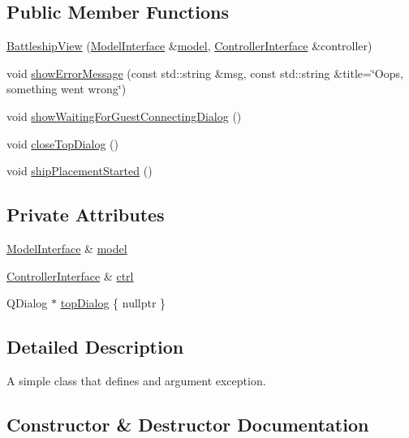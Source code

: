 \subsection*{Public Member Functions}
\begin{DoxyCompactItemize}
\item 
\hyperlink{classGUI_1_1BattleshipView_ac9fd11bfc017f0fe052608d297a5d457}{Battleship\+View} (\hyperlink{classModelInterface}{Model\+Interface} \&\hyperlink{classGUI_1_1BattleshipView_a9253735219a238f80643188b190e90ce}{model}, \hyperlink{classControllerInterface}{Controller\+Interface} \&controller)
\item 
void \hyperlink{classGUI_1_1BattleshipView_af7b5e55bee9a37cc4f9a861af40c120b}{show\+Error\+Message} (const std\+::string \&msg, const std\+::string \&title=\char`\"{}Oops, something went wrong\char`\"{})
\item 
void \hyperlink{classGUI_1_1BattleshipView_a511f6d90d37e864a1879eb6f5bd6f9cb}{show\+Waiting\+For\+Guest\+Connecting\+Dialog} ()
\item 
void \hyperlink{classGUI_1_1BattleshipView_aec4e5a4c453a3913c0a25435cfc92dd6}{close\+Top\+Dialog} ()
\item 
void \hyperlink{classGUI_1_1BattleshipView_a471a07ce060e70b1cfa03ce3674fba80}{ship\+Placement\+Started} ()
\end{DoxyCompactItemize}
\subsection*{Private Attributes}
\begin{DoxyCompactItemize}
\item 
\hyperlink{classModelInterface}{Model\+Interface} \& \hyperlink{classGUI_1_1BattleshipView_a9253735219a238f80643188b190e90ce}{model}
\item 
\hyperlink{classControllerInterface}{Controller\+Interface} \& \hyperlink{classGUI_1_1BattleshipView_a15e61471831211a4301410bdd802a4a4}{ctrl}
\item 
Q\+Dialog $\ast$ \hyperlink{classGUI_1_1BattleshipView_a08be9ec085bb0c3f19f8efe83902b4cb}{top\+Dialog} \{ nullptr \}
\end{DoxyCompactItemize}


\subsection{Detailed Description}
A simple class that defines and argument exception. 

\subsection{Constructor \& Destructor Documentation}

